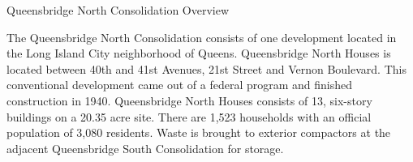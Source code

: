 Queensbridge North Consolidation Overview

The Queensbridge North Consolidation consists of one development located in the Long Island City neighborhood of Queens. Queensbridge North Houses is located between 40th and 41st Avenues, 21st Street and Vernon Boulevard. This conventional development came out of a federal program and finished construction in 1940. Queensbridge North Houses consists of 13, six-story buildings on a 20.35 acre site. There are 1,523 households with an official population of 3,080 residents. Waste is brought to exterior compactors at the adjacent Queensbridge South Consolidation for storage.